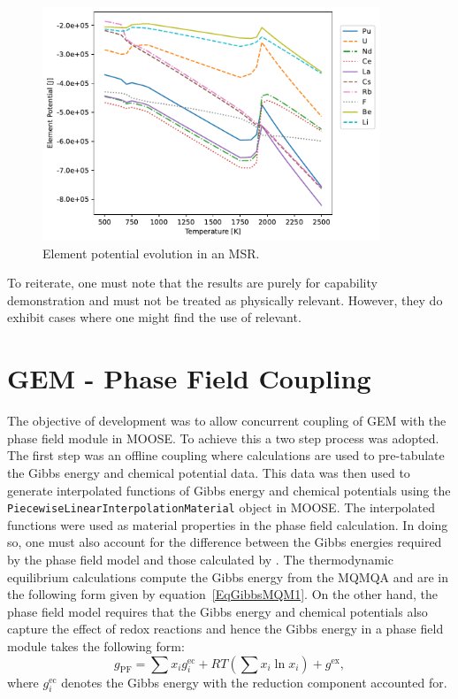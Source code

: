     \begin{figure}[ht]
        \centering
        \includegraphics[width=0.9\textwidth]{figures/chapter-7/msr_ep.pdf}
        \caption{Element potential evolution in an MSR.}
        \label{fig:res_epmsr}
     \end{figure}
To reiterate, one must note that the results are purely for capability demonstration and must not be treated as physically relevant. However, they do exhibit cases where one might find the use of {\GEM} relevant.

\section{GEM - Phase Field Coupling}\label{sec:gem_pf}
The objective of {\YJ} development was to allow concurrent coupling of GEM with the phase field module in MOOSE. To achieve this a two step process was adopted. The first step was an offline coupling where {\GEM} calculations are used to pre-tabulate the Gibbs energy and chemical potential data. This data was then used to generate interpolated functions of Gibbs energy and chemical potentials using the \texttt{PiecewiseLinearInterpolationMaterial} object in MOOSE. The interpolated functions were used as material properties in the phase field calculation. In doing so, one must also account for the difference between the Gibbs energies required by the phase field model and those calculated by {\GEM}. The thermodynamic equilibrium calculations compute the Gibbs energy from the MQMQA and are in the following form given by equation~\eqref{EqGibbsMQM1}. On the other hand, the phase field model requires that the Gibbs energy and chemical potentials also capture the effect of redox reactions and hence the Gibbs energy in a phase field module takes the following form:
\begin{equation}
	g_\text{PF} = \sum x_i g_i^\text{ec}  + RT\left( \sum x_i \ln{x_i} \right) + g^\text{ex},
\end{equation}
where $g_i^\text{ec}$ denotes the Gibbs energy with the reduction component accounted for. 

